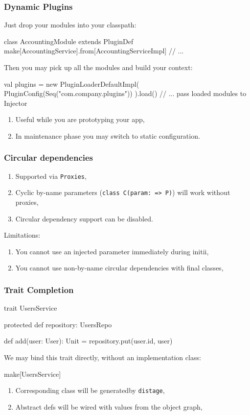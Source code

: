 \documentclass[usenames,dvipsnames]{beamer}
\newcommand{\distage}{\texttt{distage}\xspace}
\begin{document}
\begin{frame}[fragile]
  \frametitle{Dynamic Plugins}
  Just drop your modules into your classpath:
  \begin{scalacode}
class AccountingModule extends PluginDef {
  make[AccountingService].from[AccountingServiceImpl]
  // ...
}
  \end{scalacode}
  Then you may pick up all the modules and build your context:
  \begin{scalacode}
val plugins = new PluginLoaderDefaultImpl(
  PluginConfig(Seq("com.company.plugins"))
).load()
// ... pass loaded modules to Injector
  \end{scalacode}
  \begin{enumerate}
  \item Useful while you are prototyping your app,
  \item In maintenance phase you may switch to static configuration.
  \end{enumerate}
\end{frame}

\begin{frame}
  \frametitle{Circular dependencies}
  \begin{enumerate}
    \item Supported via \texttt{Proxies},
    \item Cyclic by-name parameters (\texttt{class C(param: => P)}) will work without proxies,
    \item Circular dependency support can be disabled.
  \end{enumerate}

  Limitations:
  \begin{enumerate}
    \item You cannot use an injected parameter immediately during initii,
    \item You cannot use non-by-name circular dependencies with final classes,
  \end{enumerate}
\end{frame}

\begin{frame}[fragile]
\frametitle{Trait Completion}
\begin{scalacode}
trait UsersService {
  protected def repository: UsersRepo
  
  def add(user: User): Unit = {
    repository.put(user.id, user)
  }
}
\end{scalacode}
We may bind this trait directly, without an implementation class:

\begin{scalacode}
make[UsersService]
\end{scalacode}

\begin{enumerate}
\item Corresponding class will be generated\footnotemark[1] by \distage,
\item Abstract defs will be wired with values from the object graph,
\end{enumerate}

\end{frame}
\end{document}

